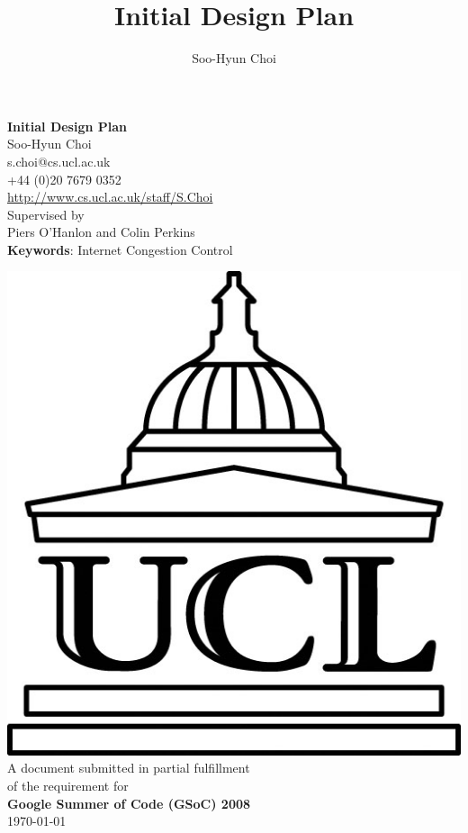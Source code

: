 \documentclass[a4paper,10pt]{article}
\title{Initial Design Plan}
\author{Soo-Hyun Choi}
\begin{document}
\begin{titlepage}
\begin{center}
{\LARGE \textsf{\textbf{Initial Design Plan\\}}}
\vspace{1cm}
{\large \textsf{Soo-Hyun Choi\\}}
{\small \textsf{s.choi@cs.ucl.ac.uk}\\}
{\small \textsf{+44 (0)20 7679 0352}\\}
{\small \url{http://www.cs.ucl.ac.uk/staff/S.Choi}\\}
\vspace{2.5cm}
{\large \textsf{Supervised by \\
Piers O'Hanlon and Colin Perkins \\}}
\vspace{2.5cm}
{\normalsize \textbf{Keywords}: Internet Congestion Control}
\end{center}

\vspace{2cm}
\begin{small}
\begin{center}
\includegraphics[scale=.15]{./img/ucl_logo} \\
\vspace{1cm}
A document submitted in partial fulfillment \\
of the requirement for \\
\textsf{\textbf{Google Summer of Code (GSoC) 2008}} \\
\vspace{1cm}
\textsf{\today}
\end{center}
\end{small}


\end{titlepage}
\end{document}
